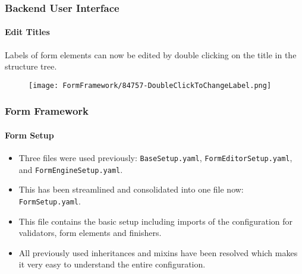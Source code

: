 
\begin{frame}[fragile]
	\frametitle{Backend User Interface}
	\framesubtitle{Edit Titles}

	Labels of form elements can now be edited by double clicking on the title in the structure tree.

	\begin{figure}
		\texttt{[image: FormFramework/84757-DoubleClickToChangeLabel.png]}
	\end{figure}

\end{frame}


\begin{frame}[fragile]
	\frametitle{Form Framework}
	\framesubtitle{Form Setup}

	\begin{itemize}
		\item Three files were used previously: \texttt{BaseSetup.yaml}, \texttt{FormEditorSetup.yaml}, and \texttt{FormEngineSetup.yaml}.
		\item This has been streamlined and consolidated into one file now: \texttt{FormSetup.yaml}.
		\item This file contains the basic setup including imports of the configuration for validators, form elements and finishers.
		\item All previously used inheritances and mixins have been resolved which makes it very easy to understand the entire configuration.
	\end{itemize}

\end{frame}


